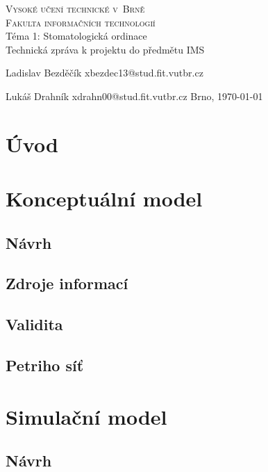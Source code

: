 \documentclass[a4paper,11pt]{article}
\begin{document}
\begin{titlepage}
	
	\begin{center}
		{\Huge\textsc{Vysoké učení technické v~Brně}}\\
		\medskip
		{\huge\textsc{Fakulta informačních technologií}}\\
		{\huge Téma 1: Stomatologická ordinace}\\
		\medskip
		{\LARGE Technická zpráva k projektu do předmětu IMS}\\
	\end{center}

Ladislav Bezděčík xbezdec13@stud.fit.vutbr.cz\hfill{}

Lukáš Drahník xdrahn00@stud.fit.vutbr.cz \hfill{}{Brno, \today}


\end{titlepage}

\newpage

\tableofcontents

\newpage

\section{Úvod}

\section{Konceptuální model}

\subsection{Návrh}
\subsection{Zdroje informací}
\subsection{Validita}
\subsection{Petriho síť}
\section{Simulační model}
\subsection{Návrh}
\end{document}
